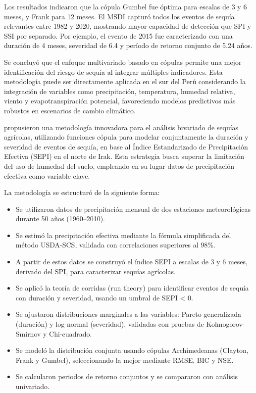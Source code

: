 Los resultados indicaron que la cópula Gumbel fue óptima para escalas de 3 y 6 meses, y Frank para 12 meses. El MSDI capturó todos los eventos de sequía relevantes entre 1982 y 2020, mostrando mayor capacidad de detección que SPI y SSI por separado. Por ejemplo, el evento de 2015 fue caracterizado con una duración de 4 meses, severidad de 6.4 y período de retorno conjunto de 5.24 años.

Se concluyó que el enfoque multivariado basado en cópulas permite una mejor identificación del riesgo de sequía al integrar múltiples indicadores. Esta metodología puede ser directamente aplicada en el sur del Perú considerando la integración de variables como precipitación, temperatura, humedad relativa, viento y evapotranspiración potencial, favoreciendo modelos predictivos más robustos en escenarios de cambio climático.


\textcite{Hasan2022} propusieron una metodología innovadora para el análisis bivariado de sequías agrícolas, utilizando funciones cópula para modelar conjuntamente la duración y severidad de eventos de sequía, en base al Índice Estandarizado de Precipitación Efectiva (SEPI) en el norte de Irak. Esta estrategia busca superar la limitación del uso de humedad del suelo, empleando en su lugar datos de precipitación efectiva como variable clave.

La metodología se estructuró de la siguiente forma:
\begin{itemize}
    \item Se utilizaron datos de precipitación mensual de dos estaciones meteorológicas durante 50 años (1960–2010).
    \item Se estimó la precipitación efectiva mediante la fórmula simplificada del método USDA-SCS, validada con correlaciones superiores al 98\%.
    \item A partir de estos datos se construyó el índice SEPI a escalas de 3 y 6 meses, derivado del SPI, para caracterizar sequías agrícolas.
    \item Se aplicó la teoría de corridas (run theory) para identificar eventos de sequía con duración y severidad, usando un umbral de SEPI < 0.
    \item Se ajustaron distribuciones marginales a las variables: Pareto generalizada (duración) y log-normal (severidad), validadas con pruebas de Kolmogorov-Smirnov y Chi-cuadrado.
    \item Se modeló la distribución conjunta usando cópulas Archimedeanas (Clayton, Frank y Gumbel), seleccionando la mejor mediante RMSE, BIC y NSE.
    \item Se calcularon periodos de retorno conjuntos y se compararon con análisis univariado.
\end{itemize}

